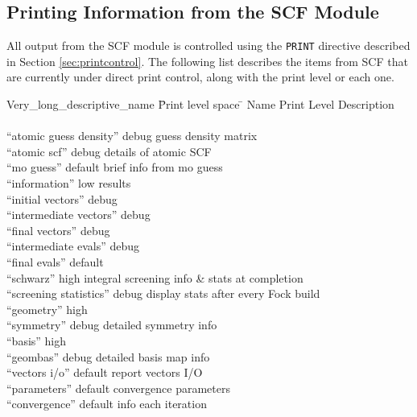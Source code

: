 

\subsection{Printing Information from the SCF Module}
\label{sec:scfprint}

All output from the SCF module is controlled using the \verb+PRINT+
directive described in Section \ref{sec:printcontrol}.  The following 
list describes the items from SCF that are currently under direct 
print control, along with the print level or each one.

\begin{tabbing}
  Very\_long\_descriptive\_name \= Print level space \= \kill
  Name                    \> Print Level \> Description \\
                          \>        \> \\
 ``atomic guess density'' \> debug  \> guess density matrix \\
 ``atomic scf''           \> debug  \> details of atomic SCF \\
 ``mo guess''             \> default\> brief info from mo guess \\
 ``information''          \> low    \> results  \\
 ``initial vectors''      \> debug  \> \\
 ``intermediate vectors'' \> debug  \> \\
 ``final vectors''        \> debug  \> \\
 ``intermediate evals''   \> debug  \> \\
 ``final evals''          \> default\> \\
 ``schwarz''              \> high   \> integral screening info \&
  stats at completion\\
 ``screening statistics'' \> debug  \> display stats after every Fock build \\
 ``geometry''             \> high   \> \\
 ``symmetry''             \> debug  \> detailed symmetry info \\
 ``basis''                \> high   \> \\
 ``geombas''              \> debug  \> detailed basis map info \\
 ``vectors i/o''          \> default\> report vectors I/O \\
 ``parameters''           \> default\> convergence parameters \\
 ``convergence''          \> default\> info each iteration
\end{tabbing}

